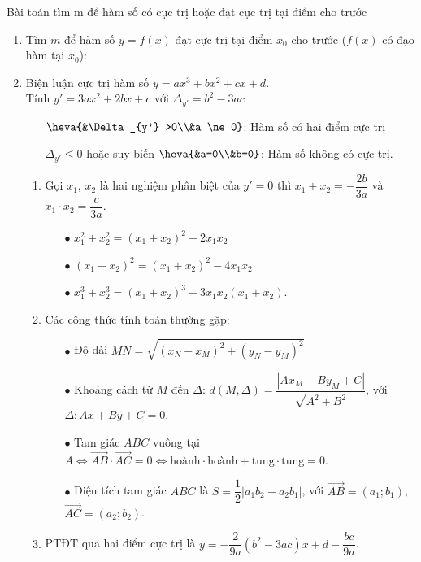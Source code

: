 \begin{dang}{Bài toán tìm m để hàm số có cực trị hoặc đạt cực trị tại điểm cho trước}
	\begin{enumerate}[\iconCV]
		\item Tìm $m$ để hàm số $y=f(x)$ đạt cực trị tại điểm $x_0$ cho trước ($f(x)$ có đạo hàm tại $x_0$):
	\item Biện luận cực trị hàm số $y=ax^3+bx^2+cx+d$.\\
	Tính $y'=3ax^2+2bx+c$ với $\Delta_{y'}=b^2-3ac$
	\begin{itemize}
		\item[\ding{172}] $\heva{&\Delta_{y'} >0\\&a \ne 0}$: Hàm số có hai điểm cực trị
		\item[\ding{173}]  $\Delta_{y'} \le 0$ hoặc suy biến $\heva{&a=0\\&b=0}$: Hàm số không có cực trị.
	\end{itemize}
		\begin{enumerate}[\iconMT]
				\item Gọi $x_1$, $x_2$ là hai nghiệm phân biệt của $y'=0$ thì $x_1+x_2=-\dfrac{2b}{3a}$ và $x_1\cdot x_2 =\dfrac{c}{3a}$.
			\begin{itemize}
				\item [$\bullet$] $x_1^2+x_2^2=(x_1+x_2)^2-2x_1 x_2$
				\item [$\bullet$] $(x_1-x_2)^2=(x_1+x_2)^2-4x_1 x_2$
				\item [$\bullet$] $x_1^3+x_2^3=(x_1+x_2)^3-3x_1x_2(x_1+x_2)$.
			\end{itemize}
			\item Các công thức tính toán thường gặp:
			\begin{itemize}
				\item [$\bullet$] Độ dài $MN=\sqrt{(x_N-x_M)^2+(y_N-y_M)^2}$
				\item [$\bullet$]  Khoảng cách từ $M$ đến $\Delta$: $d(M,\Delta)=\dfrac{|Ax_M+By_M+C|}{\sqrt{A^2+B^2}}$, với $\Delta \colon Ax+By+C=0$.
				\item [$\bullet$] Tam giác $ABC$ vuông tại $A \Leftrightarrow \overrightarrow{AB} \cdot \overrightarrow{AC}=0 \Leftrightarrow \text{hoành}\cdot\text{hoành}+\text{tung}\cdot\text{tung}=0$.
				\item [$\bullet$] Diện tích tam giác $ABC$ là  $S=\dfrac{1}{2}|a_1b_2-a_2b_1|$, với $\overrightarrow{AB}=(a_1;b_1)$, $\overrightarrow{AC}=(a_2;b_2)$.
			\end{itemize}
			\item PTĐT qua hai điểm cực trị là $y=-\dfrac{2}{9a}(b^2-3ac)x+d-\dfrac{bc}{9a}$.
		\end{enumerate}
	\end{enumerate}
\end{dang}
